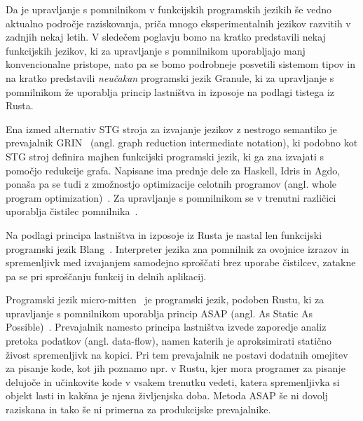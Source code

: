 
Da je upravljanje s pomnilnikom v funkcijskih programskih jezikih še vedno aktualno področje raziskovanja, priča mnogo eksperimentalnih jezikov razvitih v zadnjih nekaj letih. V sledečem poglavju bomo na kratko predstavili nekaj funkcijskih jezikov, ki za upravljanje s pomnilnikom uporabljajo manj konvencionalne pristope, nato pa se bomo podrobneje posvetili sistemom tipov in na kratko predstavili \textit{neučakan} programski jezik Granule, ki za upravljanje s pomnilnikom že uporablja princip lastništva in izposoje na podlagi tistega iz Rusta.

Ena izmed alternativ STG stroja za izvajanje jezikov z nestrogo semantiko je  prevajalnik GRIN~\cite{boquist1997grin} (angl. graph reduction intermediate notation), ki podobno kot STG stroj definira majhen funkcijski programski jezik, ki ga zna izvajati s pomočjo redukcije grafa. Napisane ima prednje dele za Haskell, Idris in Agdo, ponaša pa se tudi z zmožnostjo optimizacije celotnih programov (angl. whole program optimization)~\cite{podlovics2022modern}. Za upravljanje s pomnilnikom se v trenutni različici uporablja čistilec pomnilnika~\cite{boquist1999code}.

Na podlagi principa lastništva in izposoje iz Rusta je nastal len funkcijski programski jezik Blang~\cite{turk2022len}. Interpreter jezika zna pomnilnik za ovojnice izrazov in spremenljivk med izvajanjem samodejno sproščati brez uporabe čistilcev, zatakne pa se pri sproščanju funkcij in delnih aplikacij. 

Programski jezik micro-mitten~\cite{corbyn:practical-static-memory-management} je programski jezik, podoben Rustu, ki za upravljanje s pomnilnikom uporablja princip ASAP (angl. As Static As Possible)~\cite{proust2017asap}. Prevajalnik namesto principa lastništva izvede zaporedje analiz pretoka podatkov (angl. data-flow), namen katerih je aproksimirati statično živost spremenljivk na kopici. Pri tem prevajalnik ne postavi dodatnih omejitev za pisanje kode, kot jih poznamo npr. v Rustu, kjer mora programer za pisanje delujoče in učinkovite kode v vsakem trenutku vedeti, katera spremenljivka si objekt lasti in kakšna je njena življenjska doba. Metoda ASAP še ni dovolj raziskana in tako še ni primerna za produkcijske prevajalnike.